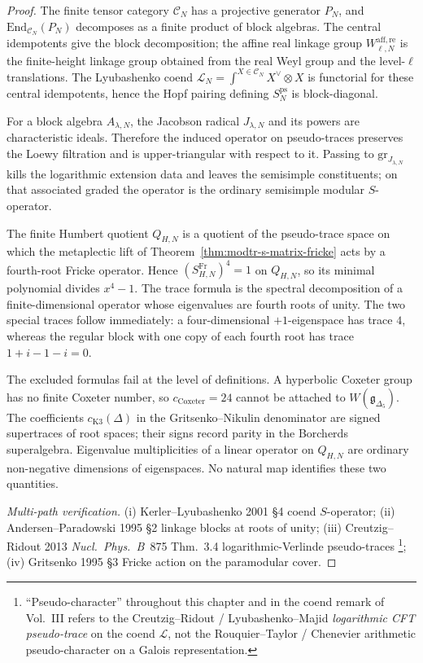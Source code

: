 \begin{proof}
The finite tensor category \(\mathcal C_N\) has a projective generator
\(P_N\), and
\(\mathrm{End}_{\mathcal C_N}(P_N)\) decomposes as a finite product of
block algebras. The central idempotents give the block decomposition;
the affine real linkage group \(W^{\mathrm{aff,re}}_{\ell,N}\) is the
finite-height linkage group obtained from the real Weyl group and the
level-\(\ell\) translations. The Lyubashenko coend
\(\mathcal L_N=\int^{X\in\mathcal C_N}X^\vee\otimes X\) is functorial
for these central idempotents, hence the Hopf pairing defining
\(S^{\mathrm{ps}}_N\) is block-diagonal.

For a block algebra \(A_{\lambda,N}\), the Jacobson radical
\(J_{\lambda,N}\) and its powers are characteristic ideals. Therefore
the induced operator on pseudo-traces preserves the Loewy filtration
and is upper-triangular with respect to it. Passing to
\(\mathrm{gr}_{J_{\lambda,N}}\) kills the logarithmic extension data
and leaves the semisimple constituents; on that associated graded the
operator is the ordinary semisimple modular \(S\)-operator.

The finite Humbert quotient \(Q_{H,N}\) is a quotient of the
pseudo-trace space on which the metaplectic lift of
Theorem~\ref{thm:modtr-s-matrix-fricke} acts by a fourth-root
Fricke operator. Hence \((S^{\mathrm{Fr}}_{H,N})^4=1\) on \(Q_{H,N}\),
so its minimal polynomial divides \(x^4-1\). The trace formula is the
spectral decomposition of a finite-dimensional operator whose
eigenvalues are fourth roots of unity. The two special traces follow
immediately: a four-dimensional \(+1\)-eigenspace has trace \(4\),
whereas the regular block with one copy of each fourth root has trace
\(1+i-1-i=0\).

The excluded formulas fail at the level of definitions. A hyperbolic
Coxeter group has no finite Coxeter number, so
\(c_{\mathrm{Coxeter}}=24\) cannot be attached to
\(W(\mathfrak g_{\Delta_5})\). The coefficients
\(c_{\mathrm{K3}}(\Delta)\) in the Gritsenko--Nikulin denominator are
signed supertraces of root spaces; their signs record parity in the
Borcherds superalgebra. Eigenvalue multiplicities of a linear operator
on \(Q_{H,N}\) are ordinary non-negative dimensions of eigenspaces.
No natural map identifies these two quantities.

\emph{Multi-path verification.}
(i) Kerler--Lyubashenko 2001 \S4 coend \(S\)-operator;
(ii) Andersen--Paradowski 1995 \S2 linkage blocks at roots of unity;
(iii) Creutzig--Ridout 2013 \emph{Nucl.~Phys.~B}~875 Thm.~3.4
 logarithmic-Verlinde pseudo-traces%
 \footnote{\label{fn:modtr-pc-disambig}``Pseudo-character''
 throughout this chapter and in the coend remark of
 Vol.~III \cite{VolI}
 refers to the Creutzig--Ridout / Lyubashenko--Majid
 \emph{logarithmic CFT pseudo-trace} on the coend \(\mathcal L\),
 not the Rouquier--Taylor / Chenevier arithmetic pseudo-character
 on a Galois representation.};
(iv) Gritsenko 1995 \S3 Fricke action on the paramodular cover.
\end{proof}

